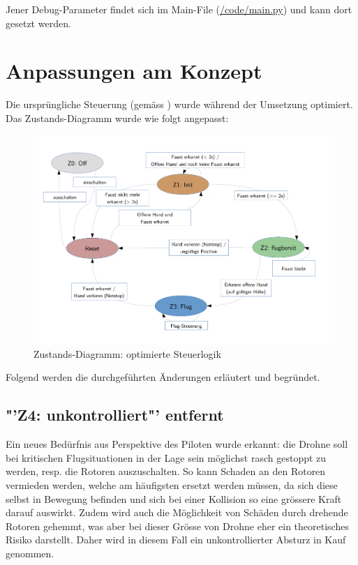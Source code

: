 Jener Debug-Parameter findet sich im Main-File (\href{https://github.com/MrJack91/droneGestures/blob/master/code/main.py}{/code/main.py}) und kann dort gesetzt werden.



\section{Anpassungen am Konzept}
\label{sec:poc:conceptChanges}
Die ursprüngliche Steuerung (gemäss ) wurde während der Umsetzung optimiert.\\
Das Zustands-Diagramm wurde wie folgt angepasst:
\begin{figure}[H]
	\centering
	\includegraphics[width=1.0\textwidth]{figures/concept/state-diagram-2.pdf}
	\caption{Zustands-Diagramm: optimierte Steuerlogik}
\end{figure}

Folgend werden die durchgeführten Änderungen erläutert und begründet.

\subsection{"'Z4: unkontrolliert"' entfernt}
Ein neues Bedürfnis aus Perspektive des Piloten wurde erkannt: die Drohne soll bei kritischen Flugsituationen in der Lage sein möglichst rasch gestoppt zu werden, resp. die Rotoren auszuschalten.
So kann Schaden an den Rotoren vermieden werden, welche am häufigsten ersetzt werden müssen, da sich diese selbst in Bewegung befinden und sich bei einer Kollision so eine grössere Kraft darauf auswirkt.
Zudem wird auch die Möglichkeit von Schäden durch drehende Rotoren gehemmt, was aber bei dieser Grösse von Drohne eher ein theoretisches Risiko darstellt.
Daher wird in diesem Fall ein unkontrollierter Absturz in Kauf genommen.

